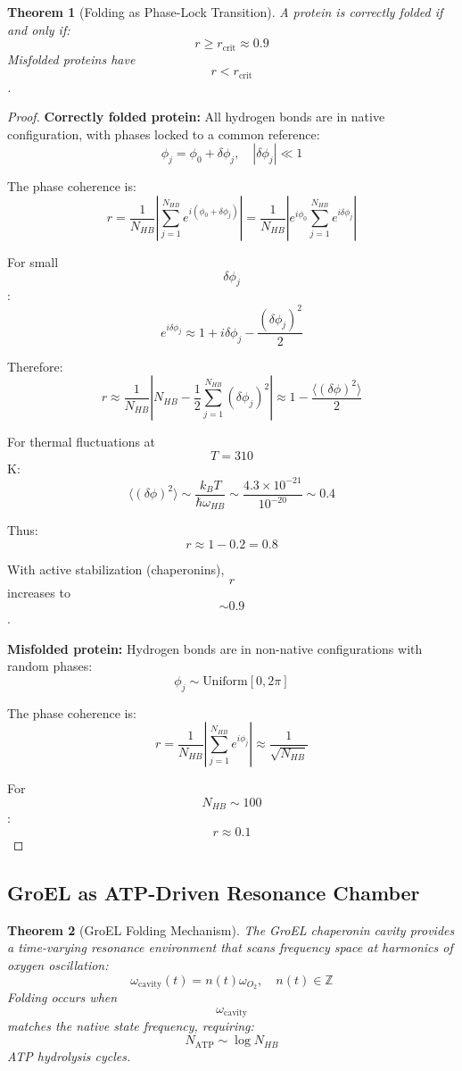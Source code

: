 \documentclass[12pt,a4paper]{article}
\newtheorem{theorem}{Theorem}
\begin{document}
\begin{theorem}[Folding as Phase-Lock Transition]
A protein is correctly folded if and only if:
$$
r \geq r_{\text{crit}} \approx 0.9
$$
Misfolded proteins have $$r < r_{\text{crit}}$$.
\end{theorem}

\begin{proof}
\textbf{Correctly folded protein:} All hydrogen bonds are in native configuration, with phases locked to a common reference:
$$
\phi_j = \phi_0 + \delta\phi_j, \quad |\delta\phi_j| \ll 1
$$

The phase coherence is:
$$
r = \frac{1}{N_{HB}} \left| \sum_{j=1}^{N_{HB}} e^{i(\phi_0 + \delta\phi_j)} \right| = \frac{1}{N_{HB}} \left| e^{i\phi_0} \sum_{j=1}^{N_{HB}} e^{i\delta\phi_j} \right|
$$

For small $$\delta\phi_j$$:
$$
e^{i\delta\phi_j} \approx 1 + i\delta\phi_j - \frac{(\delta\phi_j)^2}{2}
$$

Therefore:
$$
r \approx \frac{1}{N_{HB}} \left| N_{HB} - \frac{1}{2} \sum_{j=1}^{N_{HB}} (\delta\phi_j)^2 \right| \approx 1 - \frac{\langle (\delta\phi)^2 \rangle}{2}
$$

For thermal fluctuations at $$T = 310$$ K:
$$
\langle (\delta\phi)^2 \rangle \sim \frac{k_B T}{\hbar \omega_{HB}} \sim \frac{4.3 \times 10^{-21}}{10^{-20}} \sim 0.4
$$

Thus:
$$
r \approx 1 - 0.2 = 0.8
$$

With active stabilization (chaperonins), $$r$$ increases to $$\sim 0.9$$.

\textbf{Misfolded protein:} Hydrogen bonds are in non-native configurations with random phases:
$$
\phi_j \sim \text{Uniform}[0, 2\pi]
$$

The phase coherence is:
$$
r = \frac{1}{N_{HB}} \left| \sum_{j=1}^{N_{HB}} e^{i\phi_j} \right| \approx \frac{1}{\sqrt{N_{HB}}}
$$

For $$N_{HB} \sim 100$$:
$$
r \approx 0.1
$$
\end{proof}

\subsection{GroEL as ATP-Driven Resonance Chamber}

\begin{theorem}[GroEL Folding Mechanism]
The GroEL chaperonin cavity provides a time-varying resonance environment that scans frequency space at harmonics of oxygen oscillation:
$$
\omega_{\text{cavity}}(t) = n(t) \omega_{O_2}, \quad n(t) \in \mathbb{Z}
$$
Folding occurs when $$\omega_{\text{cavity}}$$ matches the native state frequency, requiring:
$$
N_{\text{ATP}} \sim \log N_{HB}
$$
ATP hydrolysis cycles.
\end{theorem}
\end{document}
